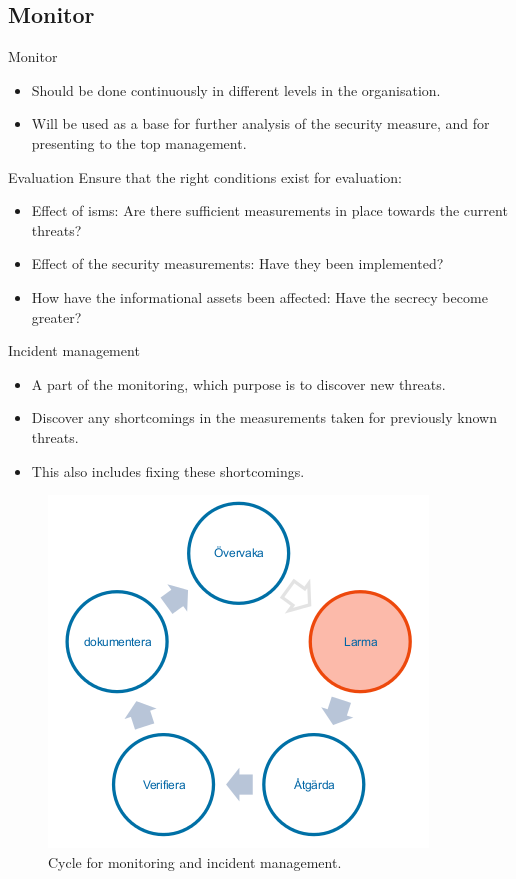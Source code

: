 \documentclass{beamer}
\begin{document}
\subsection{Monitor}
\begin{frame}{Monitor}
  \begin{itemize}
    \item Should be done continuously in different levels in the organisation.
    \item Will be used as a base for further analysis of the security measure,
      and for presenting to the top management.
  \end{itemize}
\end{frame}
\begin{frame}{Evaluation}
  Ensure that the right conditions exist for evaluation:
  \begin{itemize}
    \item Effect of \ac{isms}\@: Are there sufficient measurements in place towards the current threats?
    \item Effect of the security measurements: Have they been implemented?
    \item How have the informational assets been affected: Have the secrecy become greater?
  \end{itemize}
\end{frame}
\begin{frame}{Incident management}
  \begin{itemize}
    \item A part of the monitoring, which purpose is to discover new threats.
    \item Discover any shortcomings in the measurements taken for previously
      known threats.
    \item This also includes fixing these shortcomings.
  \end{itemize}
  \begin{figure}
    \includegraphics[height=0.4\textheight]{overvakning.png}
    \caption{Cycle for monitoring and incident management.}
  \end{figure}
\end{frame}
\end{document}
